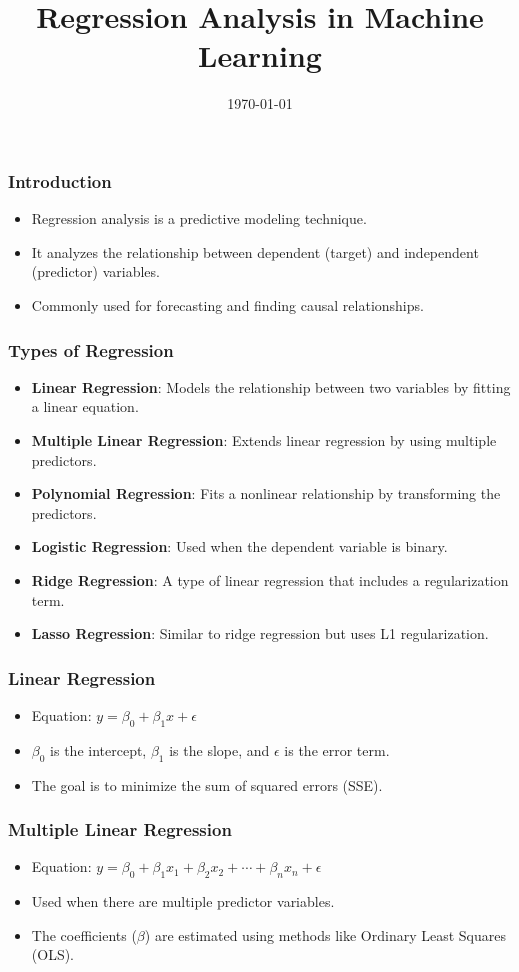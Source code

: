 \documentclass{beamer}
\title{Regression Analysis in Machine Learning}
\author{}
\date{\today}
\begin{document}
\frame{\titlepage}

\begin{frame}
\frametitle{Introduction}
\begin{itemize}
    \item Regression analysis is a predictive modeling technique.
    \item It analyzes the relationship between dependent (target) and independent (predictor) variables.
    \item Commonly used for forecasting and finding causal relationships.
\end{itemize}
\end{frame}

\begin{frame}
\frametitle{Types of Regression}
\begin{itemize}
    \item \textbf{Linear Regression}: Models the relationship between two variables by fitting a linear equation.
    \item \textbf{Multiple Linear Regression}: Extends linear regression by using multiple predictors.
    \item \textbf{Polynomial Regression}: Fits a nonlinear relationship by transforming the predictors.
    \item \textbf{Logistic Regression}: Used when the dependent variable is binary.
    \item \textbf{Ridge Regression}: A type of linear regression that includes a regularization term.
    \item \textbf{Lasso Regression}: Similar to ridge regression but uses L1 regularization.
\end{itemize}
\end{frame}

\begin{frame}
\frametitle{Linear Regression}
\begin{itemize}
    \item Equation: \( y = \beta_0 + \beta_1 x + \epsilon \)
    \item \(\beta_0\) is the intercept, \(\beta_1\) is the slope, and \(\epsilon\) is the error term.
    \item The goal is to minimize the sum of squared errors (SSE).
\end{itemize}
\end{frame}

\begin{frame}
\frametitle{Multiple Linear Regression}
\begin{itemize}
    \item Equation: \( y = \beta_0 + \beta_1 x_1 + \beta_2 x_2 + \cdots + \beta_n x_n + \epsilon \)
    \item Used when there are multiple predictor variables.
    \item The coefficients (\(\beta\)) are estimated using methods like Ordinary Least Squares (OLS).
\end{itemize}
\end{frame}
\end{document}
